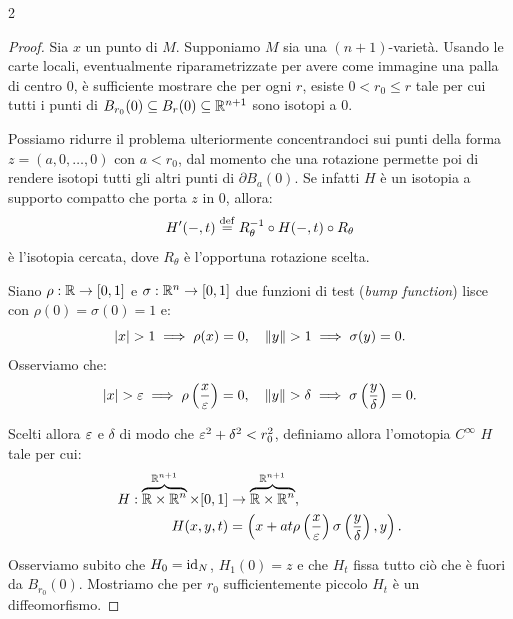 \begin{multicols*}{2}
    \begin{proof}
        Sia $x$ un punto di $M$. Supponiamo $M$ sia una $(n+1)$-varietà.
        Usando le carte locali, eventualmente riparametrizzate
        per avere come immagine una palla di centro $0$, è sufficiente mostrare
        che per ogni $r$, esiste $0 < r_0 \leq r$ tale per cui
        tutti i punti di $B_{r_0}(0) \subseteq B_r(0) \subseteq \mathbb{R}^{n+1}$ sono isotopi a $0$. \smallskip

        Possiamo ridurre il problema ulteriormente concentrandoci sui punti
        della forma $z = (a, 0, \ldots, 0)$ con $a < r_0$, dal momento che una rotazione
        permette poi di rendere isotopi tutti gli altri punti di $\partial B_a(0)$. Se
        infatti $H$ è un isotopia a supporto compatto che porta $z$ in $0$, allora:
        \[ H'(-, t) \overset{\mathrm{def}}{=} R_\theta^{-1} \circ H(-, t) \circ R_\theta \]
        è l'isotopia cercata, dove $R_\theta$ è l'opportuna rotazione scelta. \smallskip

        Siano $\rho : \mathbb{R} \to [0, 1]$ e $\sigma : \mathbb{R}^n \to [0, 1]$ due funzioni di test
        (\textit{bump function}) lisce con $\rho(0) = \sigma(0) = 1$ e:
        \[ \left\lvert x \right\rvert > 1 \implies \rho(x) = 0, \quad \left\lVert y \right\rVert > 1 \implies \sigma(y) = 0. \]
        Osserviamo che:
        \[
            \left\lvert x \right\rvert > \varepsilon \implies \rho\left(\frac{x}{\varepsilon}\right) = 0, \quad \left\lVert y \right\rVert > \delta \implies \sigma\left(\frac{y}{\delta}\right) = 0.
        \]

        Scelti allora $\varepsilon$ e $\delta$ di modo che $\varepsilon^2 + \delta^2 < r_0^2$, definiamo allora l'omotopia $C^\infty$ $H$ tale per cui:
        \begin{equation*}
            \begin{aligned}
                H : \overbrace{\mathbb{R} \times \mathbb{R}^n}^{\mathclap{\mathbb{R}^{n+1}}} \times [0, 1] & \to \overbrace{\mathbb{R} \times \mathbb{R}^n}^{\mathclap{\mathbb{R}^{n+1}}},                         \\
                H(x, y, t)                                                                                 & = \left(x + a t \rho\left(\frac{x}{\varepsilon}\right) \sigma\left(\frac{y}{\delta}\right), y\right).
            \end{aligned}
        \end{equation*}

        Osserviamo subito che $H_0 = \operatorname{id}_N$, $H_1(0) = z$ e che $H_t$ fissa tutto ciò che è fuori
        da $B_{r_0}(0)$. Mostriamo che per $r_0$ sufficientemente piccolo $H_t$ è un diffeomorfismo. \smallskip


\end{proof}
\end{multicols*}
